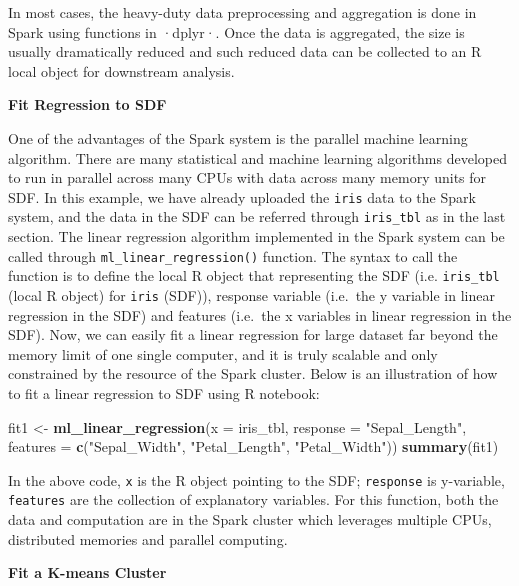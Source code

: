 \documentclass[12pt,]{krantz}
\makeatletter
\newenvironment{Shaded}{\begin{snugshade}}{\end{snugshade}}
\newcommand{\DataTypeTok}[1]{\textcolor[rgb]{0.27,0.27,0.27}{#1}}
\newcommand{\KeywordTok}[1]{\textcolor[rgb]{0.27,0.27,0.27}{\textbf{#1}}}
\newcommand{\NormalTok}[1]{#1}
\newcommand{\StringTok}[1]{\textcolor[rgb]{0.5,0.5,0.5}{#1}}
\newenvironment{kframe}{%
\medskip{}
\setlength{\fboxsep}{.8em}
 \def\at@end@of@kframe{}%
 \ifinner\ifhmode%
  \def\at@end@of@kframe{\end{minipage}}%
  \begin{minipage}{\columnwidth}%
 \fi\fi%
 \def\FrameCommand##1{\hskip\@totalleftmargin \hskip-\fboxsep
 \colorbox{shadecolor}{##1}\hskip-\fboxsep
     \hskip-\linewidth \hskip-\@totalleftmargin \hskip\columnwidth}%
 \MakeFramed {\advance\hsize-\width
   \@totalleftmargin\z@ \linewidth\hsize
   \@setminipage}}%
 {\par\unskip\endMakeFramed%
 \at@end@of@kframe}
\renewenvironment{Shaded}{\begin{kframe}}{\end{kframe}}
\makeatother
\begin{document}
In most cases, the heavy-duty data preprocessing and aggregation is done in Spark using functions in ·dplyr·. Once the data is aggregated, the size is usually dramatically reduced and such reduced data can be collected to an R local object for downstream analysis.

\textbf{Fit Regression to SDF}

One of the advantages of the Spark system is the parallel machine learning algorithm. There are many statistical and machine learning algorithms developed to run in parallel across many CPUs with data across many memory units for SDF. In this example, we have already uploaded the \texttt{iris} data to the Spark system, and the data in the SDF can be referred through \texttt{iris\_tbl} as in the last section. The linear regression algorithm implemented in the Spark system can be called through \texttt{ml\_linear\_regression()} function. The syntax to call the function is to define the local R object that representing the SDF (i.e. \texttt{iris\_tbl} (local R object) for \texttt{iris} (SDF)), response variable (i.e.~the y variable in linear regression in the SDF) and features (i.e.~the x variables in linear regression in the SDF). Now, we can easily fit a linear regression for large dataset far beyond the memory limit of one single computer, and it is truly scalable and only constrained by the resource of the Spark cluster. Below is an illustration of how to fit a linear regression to SDF using R notebook:

\begin{Shaded}
\begin{Highlighting}[]
\NormalTok{fit1 <-}\StringTok{ }\KeywordTok{ml_linear_regression}\NormalTok{(}\DataTypeTok{x =}\NormalTok{ iris_tbl, }\DataTypeTok{response =} \StringTok{"Sepal_Length"}\NormalTok{,}
        \DataTypeTok{features =} \KeywordTok{c}\NormalTok{(}\StringTok{"Sepal_Width"}\NormalTok{, }\StringTok{"Petal_Length"}\NormalTok{, }\StringTok{"Petal_Width"}\NormalTok{))}
\KeywordTok{summary}\NormalTok{(fit1)}
\end{Highlighting}
\end{Shaded}

In the above code, \texttt{x} is the R object pointing to the SDF; \texttt{response} is y-variable, \texttt{features} are the collection of explanatory variables. For this function, both the data and computation are in the Spark cluster which leverages multiple CPUs, distributed memories and parallel computing.

\textbf{Fit a K-means Cluster}
\end{document}
